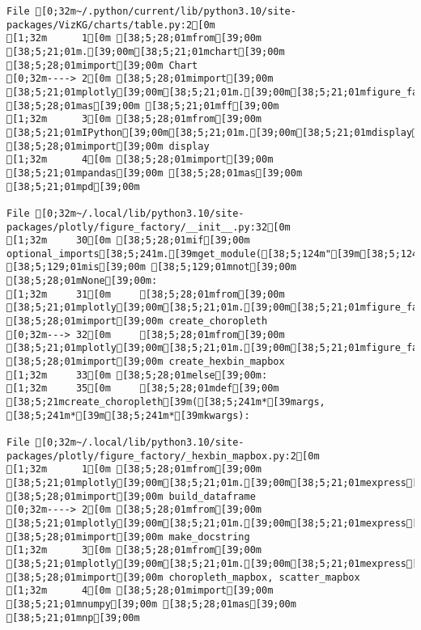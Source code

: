 \documentclass[
  letterpaper,
]{book}
\begin{document}
\begin{verbatim}
File [0;32m~/.python/current/lib/python3.10/site-packages/VizKG/charts/table.py:2[0m
[1;32m      1[0m [38;5;28;01mfrom[39;00m [38;5;21;01m.[39;00m[38;5;21;01mchart[39;00m [38;5;28;01mimport[39;00m Chart
[0;32m----> 2[0m [38;5;28;01mimport[39;00m [38;5;21;01mplotly[39;00m[38;5;21;01m.[39;00m[38;5;21;01mfigure_factory[39;00m [38;5;28;01mas[39;00m [38;5;21;01mff[39;00m
[1;32m      3[0m [38;5;28;01mfrom[39;00m [38;5;21;01mIPython[39;00m[38;5;21;01m.[39;00m[38;5;21;01mdisplay[39;00m [38;5;28;01mimport[39;00m display
[1;32m      4[0m [38;5;28;01mimport[39;00m [38;5;21;01mpandas[39;00m [38;5;28;01mas[39;00m [38;5;21;01mpd[39;00m

File [0;32m~/.local/lib/python3.10/site-packages/plotly/figure_factory/__init__.py:32[0m
[1;32m     30[0m [38;5;28;01mif[39;00m optional_imports[38;5;241m.[39mget_module([38;5;124m"[39m[38;5;124mpandas[39m[38;5;124m"[39m) [38;5;129;01mis[39;00m [38;5;129;01mnot[39;00m [38;5;28;01mNone[39;00m:
[1;32m     31[0m     [38;5;28;01mfrom[39;00m [38;5;21;01mplotly[39;00m[38;5;21;01m.[39;00m[38;5;21;01mfigure_factory[39;00m[38;5;21;01m.[39;00m[38;5;21;01m_county_choropleth[39;00m [38;5;28;01mimport[39;00m create_choropleth
[0;32m---> 32[0m     [38;5;28;01mfrom[39;00m [38;5;21;01mplotly[39;00m[38;5;21;01m.[39;00m[38;5;21;01mfigure_factory[39;00m[38;5;21;01m.[39;00m[38;5;21;01m_hexbin_mapbox[39;00m [38;5;28;01mimport[39;00m create_hexbin_mapbox
[1;32m     33[0m [38;5;28;01melse[39;00m:
[1;32m     35[0m     [38;5;28;01mdef[39;00m [38;5;21mcreate_choropleth[39m([38;5;241m*[39margs, [38;5;241m*[39m[38;5;241m*[39mkwargs):

File [0;32m~/.local/lib/python3.10/site-packages/plotly/figure_factory/_hexbin_mapbox.py:2[0m
[1;32m      1[0m [38;5;28;01mfrom[39;00m [38;5;21;01mplotly[39;00m[38;5;21;01m.[39;00m[38;5;21;01mexpress[39;00m[38;5;21;01m.[39;00m[38;5;21;01m_core[39;00m [38;5;28;01mimport[39;00m build_dataframe
[0;32m----> 2[0m [38;5;28;01mfrom[39;00m [38;5;21;01mplotly[39;00m[38;5;21;01m.[39;00m[38;5;21;01mexpress[39;00m[38;5;21;01m.[39;00m[38;5;21;01m_doc[39;00m [38;5;28;01mimport[39;00m make_docstring
[1;32m      3[0m [38;5;28;01mfrom[39;00m [38;5;21;01mplotly[39;00m[38;5;21;01m.[39;00m[38;5;21;01mexpress[39;00m[38;5;21;01m.[39;00m[38;5;21;01m_chart_types[39;00m [38;5;28;01mimport[39;00m choropleth_mapbox, scatter_mapbox
[1;32m      4[0m [38;5;28;01mimport[39;00m [38;5;21;01mnumpy[39;00m [38;5;28;01mas[39;00m [38;5;21;01mnp[39;00m


\end{verbatim}
\end{document}
